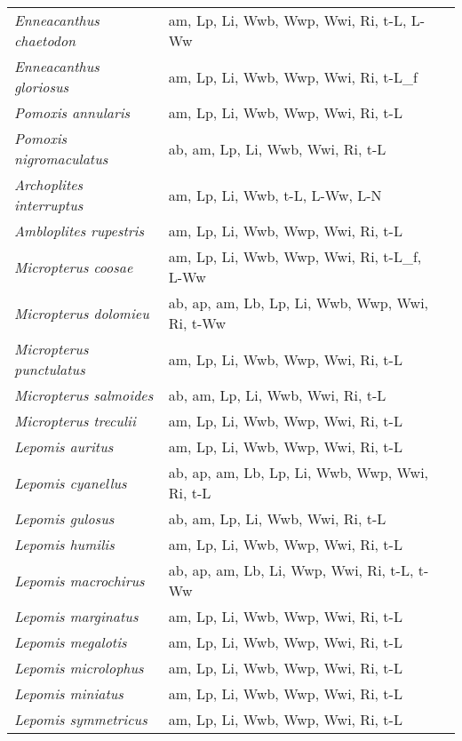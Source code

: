 {\begin{longtable}[c]{p{3.5cm}p{5.5cm}p{5.5cm}}
\emph{Enneacanthus chaetodon} &  am, Lp, Li, Wwb, Wwp, Wwi, Ri, t-L, L-Ww & \citet{Schw1961} \\
\emph{Enneacanthus gloriosus} &  am, Lp, Li, Wwb, Wwp, Wwi, Ri, t-L\_f & \citet{SnydPete1999} \\
\emph{Pomoxis annularis} &  am, Lp, Li, Wwb, Wwp, Wwi, Ri, t-L &  \\
\emph{Pomoxis nigromaculatus} &  ab, am, Lp, Li, Wwb, Wwi, Ri, t-L & \citet{PopeGera1996,PopeWill1998} \\
\emph{Archoplites interruptus} &  am, Lp, Li, Wwb, t-L, L-Ww, L-N & \citet{ViggKuce1981} \\
\emph{Ambloplites rupestris} &  am, Lp, Li, Wwb, Wwp, Wwi, Ri, t-L & \citet{RyanHarv1971} \\
\emph{Micropterus coosae} &  am, Lp, Li, Wwb, Wwp, Wwi, Ri, t-L\_f, L-Ww & \citet{Pars1954,Knig2011} \\
\emph{Micropterus dolomieu} &  ab, ap, am, Lb, Lp, Li, Wwb, Wwp, Wwi, Ri, t-Ww & \citet{WelsWieg2017} \\
\emph{Micropterus punctulatus} &  am, Lp, Li, Wwb, Wwp, Wwi, Ri, t-L &  \\
\emph{Micropterus salmoides} &  ab, am, Lp, Li, Wwb, Wwi, Ri, t-L & \citet{GashBass1973} \\
\emph{Micropterus treculii} &  am, Lp, Li, Wwb, Wwp, Wwi, Ri, t-L &  \\
\emph{Lepomis auritus} &  am, Lp, Li, Wwb, Wwp, Wwi, Ri, t-L &  \\
\emph{Lepomis cyanellus} &  ab, ap, am, Lb, Lp, Li, Wwb, Wwp, Wwi, Ri, t-L &  \\
\emph{Lepomis gulosus} &  ab, am, Lp, Li, Wwb, Wwi, Ri, t-L & \citet{GashBass1973} \\
\emph{Lepomis humilis} &  am, Lp, Li, Wwb, Wwp, Wwi, Ri, t-L & \citet{BarnAnso1923} \\
\emph{Lepomis macrochirus} &  ab, ap, am, Lb, Li, Wwp, Wwi, Ri, t-L, t-Ww & \citet{HicPie2012,SwiSmi1943,Par2013,TanMof1995,Mec2008,Est1949,HogKil1975} \\
\emph{Lepomis marginatus} &  am, Lp, Li, Wwb, Wwp, Wwi, Ri, t-L &  \\
\emph{Lepomis megalotis} &  am, Lp, Li, Wwb, Wwp, Wwi, Ri, t-L &  \\
\emph{Lepomis microlophus} &  am, Lp, Li, Wwb, Wwp, Wwi, Ri, t-L &  \\
\emph{Lepomis miniatus} &  am, Lp, Li, Wwb, Wwp, Wwi, Ri, t-L &  \\
\emph{Lepomis symmetricus} &  am, Lp, Li, Wwb, Wwp, Wwi, Ri, t-L &  \\

\end{longtable}}
